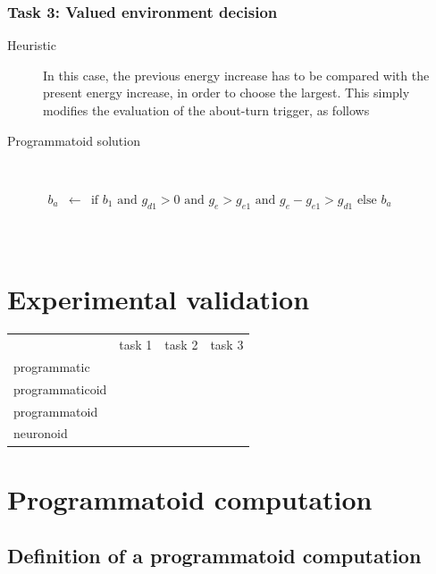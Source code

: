 \documentclass[a4]{article} \usepackage[left=2cm,right=3cm,top=1cm,bottom=2cm]{geometry}
\newcommand{\eqline}[1]{~\vspace{0.1cm}\\\centerline{$#1$}\vspace{0.1cm}\\}
\begin{document}
\subsubsection{Task 3: Valued environment decision} \begin{description} 
  \item[Heuristic] In this case, the previous energy increase has to be compared with the present energy increase, in order to choose the largest. This simply modifies the evaluation of the about-turn trigger, as follows
   \item[Programmatoid solution] \eqline{\begin{array}{rcl}
      b_a &\leftarrow& \mbox{if }  b_1  \mbox{ and } g_{d1} > 0 \mbox{ and } g_e > g_{e1} \mbox{ and } g_e - g_{e1} > g_{d1} \mbox{ else } b_a \\
 \end{array}} \end{description}
      
\section{Experimental validation}

\begin{tabular}{l|c|c|c|}
     	                       & task 1 & task 2 & task 3 \\
programmatic      &   &  &  \\
programmaticoid &   &  &  \\
programmatoid    &  &  &  \\
neuronoid             &  &  &  \\
\end{tabular}

\section{Programmatoid computation} \label{programmatoid}

\subsection{Definition of a programmatoid computation}
\end{document}
